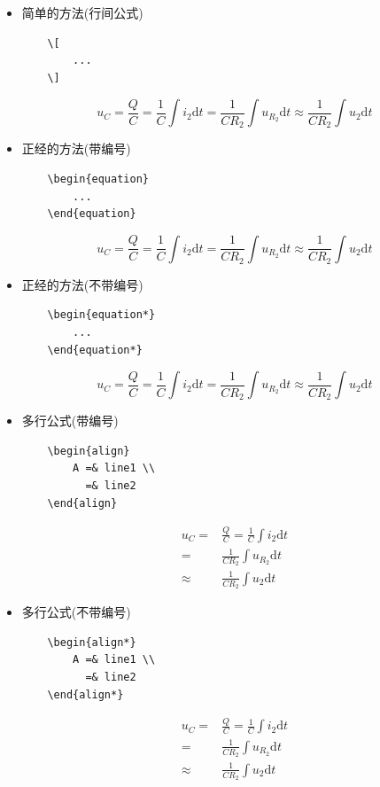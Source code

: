 \documentclass[11pt]{article}
\begin{document}
\begin{itemize}
    \item 简单的方法(行间公式)
    \begin{lstlisting}
    \[
        ...
    \]
    \end{lstlisting}
    \[
        u_{C}=\frac{Q}{C}=\frac{1}{C}\int{i_{2}\mathrm{d}t}=\frac{1}{CR_{2}}\int{u_{R_{2}}\mathrm{d}t}\approx \frac{1}{CR_{2}}\int{u_{2}\mathrm{d}t}
    \]
    \item 正经的方法(带编号)
    \begin{lstlisting}
    \begin{equation}
        ...
    \end{equation}
    \end{lstlisting}
    \begin{equation}
        u_{C}=\frac{Q}{C}=\frac{1}{C}\int{i_{2}\mathrm{d}t}=\frac{1}{CR_{2}}\int{u_{R_{2}}\mathrm{d}t}\approx \frac{1}{CR_{2}}\int{u_{2}\mathrm{d}t}
    \end{equation}
    \item 正经的方法(不带编号)
    \begin{lstlisting}
    \begin{equation*}
        ...
    \end{equation*}
    \end{lstlisting}
    \begin{equation*}
        u_{C}=\frac{Q}{C}=\frac{1}{C}\int{i_{2}\mathrm{d}t}=\frac{1}{CR_{2}}\int{u_{R_{2}}\mathrm{d}t}\approx \frac{1}{CR_{2}}\int{u_{2}\mathrm{d}t}
    \end{equation*}
    \item 多行公式(带编号)
    \begin{lstlisting}
    \begin{align}
        A =& line1 \\
          =& line2
    \end{align}
    \end{lstlisting}
    \begin{align}
        u_{C} =& \frac{Q}{C}=\frac{1}{C}\int{i_{2}\mathrm{d}t} \\ 
        =& \frac{1}{CR_{2}}\int{u_{R_{2}}\mathrm{d}t} \\
        \approx& \frac{1}{CR_{2}}\int{u_{2}\mathrm{d}t}
    \end{align}
    \item 多行公式(不带编号)
    \begin{lstlisting}
    \begin{align*}
        A =& line1 \\
          =& line2
    \end{align*}
    \end{lstlisting}
    \begin{align*}
        u_{C} =& \frac{Q}{C}=\frac{1}{C}\int{i_{2}\mathrm{d}t} \\ 
        =& \frac{1}{CR_{2}}\int{u_{R_{2}}\mathrm{d}t} \\
        \approx& \frac{1}{CR_{2}}\int{u_{2}\mathrm{d}t}
    \end{align*}
\end{itemize}
\end{document}
